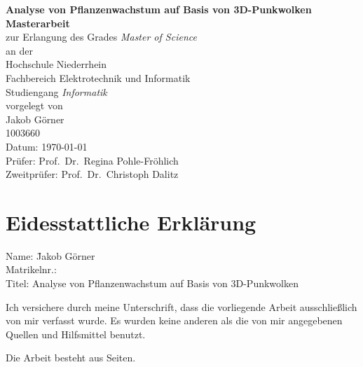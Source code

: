 \documentclass[12pt,titlepage, twoside]{article}
\begin{document}
\begin{titlepage}
\begin{center}
{\Large\bf Analyse von Pflanzenwachstum auf Basis von 3D-Punkwolken}\\[3cm]

{\bf Masterarbeit}\\
zur Erlangung des Grades {\em Master of Science}\\[1.5cm]

an der\\
Hochschule Niederrhein\\
Fachbereich Elektrotechnik und Informatik\\
Studiengang {\em Informatik}\\[3cm]

vorgelegt von\\
Jakob Görner\\
1003660\\[3cm]
Datum: \today\\[3cm]

Prüfer: Prof.~Dr.~Regina Pohle-Fröhlich\\
Zweitprüfer: Prof.~Dr.~Christoph Dalitz

\end{center}
\end{titlepage}

\pagestyle{empty}
\cleardoublepage

\newpage


\section*{Eidesstattliche Erklärung}
\begin{tabbing}
Name: \hspace{4em}\= Jakob Görner\\
Matrikelnr.: \\
Titel: \> Analyse von Pflanzenwachstum auf Basis von 3D-Punkwolken
\end{tabbing}

Ich versichere durch meine Unterschrift, dass die vorliegende
Arbeit ausschließlich von mir verfasst wurde.
Es wurden keine anderen als die von mir angegebenen Quellen und Hilfsmittel
benutzt.

Die Arbeit besteht aus \pageref{LastPage} Seiten.
\end{document}
